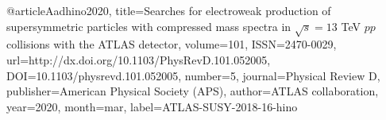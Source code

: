 @article{Aadhino2020, 
    title={Searches for electroweak production of supersymmetric particles with compressed mass spectra in $\sqrt{s}=13$ TeV $pp$ collisions with the ATLAS detector}, 
    volume={101}, 
    ISSN={2470-0029}, 
    url={http://dx.doi.org/10.1103/PhysRevD.101.052005}, 
    DOI={10.1103/physrevd.101.052005}, 
    number={5}, 
    journal={Physical Review D}, 
    publisher={American Physical Society (APS)}, 
    author={ATLAS collaboration}, 
    year={2020}, 
    month=mar,
    label={ATLAS-SUSY-2018-16-hino}
}
